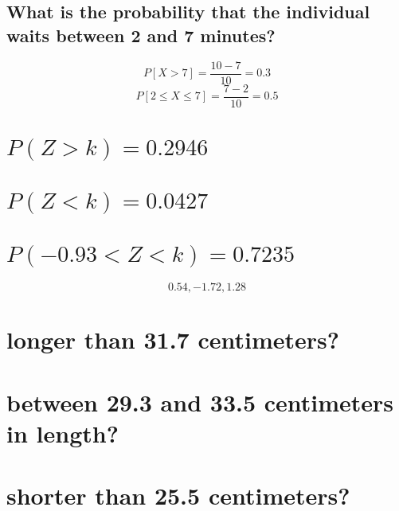 \documentclass[answers]{exam}
\begin{document}
\begin{questions}
\begin{parts}
	\part{What is the probability that the individual waits between 2 and 7 minutes?}
\end{parts}

\begin{solution}
	$$P[X>7] = \frac{10-7}{10} = 0.3$$
	$$P[2\leq X\leq 7] = \frac{7-2}{10} = 0.5$$
\end{solution}


\begin{parts}
	\part{$P(Z>k) = 0.2946$}
	\part{$P(Z<k) = 0.0427$}
	\part{$P(-0.93<Z<k) = 0.7235$}
\end{parts}

\begin{solution}
	$$0.54,-1.72,1.28$$
\end{solution}


\begin{parts}
	\part{longer than 31.7 centimeters?}
	\part{between 29.3 and 33.5 centimeters in length?}
	\part{shorter than 25.5 centimeters?}
\end{parts}


\end{questions}
\end{document}
